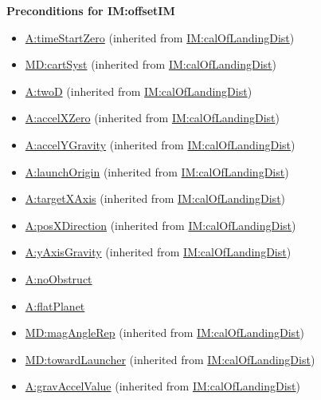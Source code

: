 \documentclass[12pt]{article}
\begin{document}
\noindent \textbf{Preconditions for IM:offsetIM}
\begin{itemize}
\item \hyperref[timeStartZero]{A:timeStartZero} (inherited from \hyperref[IM:calOfLandingDist]{IM:calOfLandingDist})
\item \hyperref[MD:cartSyst]{MD:cartSyst} (inherited from \hyperref[IM:calOfLandingDist]{IM:calOfLandingDist})
\item \hyperref[twoD]{A:twoD} (inherited from \hyperref[IM:calOfLandingDist]{IM:calOfLandingDist})
\item \hyperref[accelXZero]{A:accelXZero} (inherited from \hyperref[IM:calOfLandingDist]{IM:calOfLandingDist})
\item \hyperref[accelYGravity]{A:accelYGravity} (inherited from \hyperref[IM:calOfLandingDist]{IM:calOfLandingDist})
\item \hyperref[launchOrigin]{A:launchOrigin} (inherited from \hyperref[IM:calOfLandingDist]{IM:calOfLandingDist})
\item \hyperref[targetXAxis]{A:targetXAxis} (inherited from \hyperref[IM:calOfLandingDist]{IM:calOfLandingDist})
\item \hyperref[posXDirection]{A:posXDirection} (inherited from \hyperref[IM:calOfLandingDist]{IM:calOfLandingDist})
\item \hyperref[yAxisGravity]{A:yAxisGravity} (inherited from \hyperref[PIM:calOfLandingDist]{IM:calOfLandingDist})
\item \hyperref[noObstruct]{A:noObstruct}
\item \hyperref[flatPlanet]{A:flatPlanet}
\item \hyperref[MD:magAngleRep]{MD:magAngleRep} (inherited from \hyperref[IM:calOfLandingDist]{IM:calOfLandingDist})
\item \hyperref[MD:towardLauncher]{MD:towardLauncher} (inherited from \hyperref[IM:calOfLandingDist]{IM:calOfLandingDist})
\item \hyperref[gravAccelValue]{A:gravAccelValue} (inherited from \hyperref[IM:calOfLandingDist]{IM:calOfLandingDist})

\end{itemize}
\end{document}
